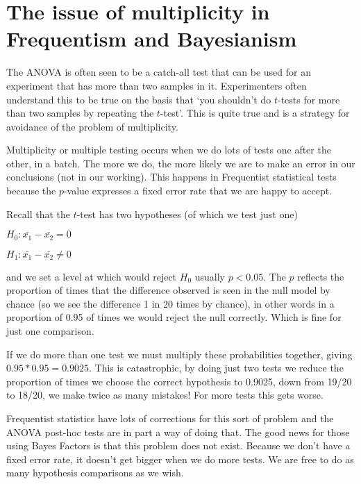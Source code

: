 \documentclass[
]{book}
\begin{document}
\hypertarget{the-issue-of-multiplicity-in-frequentism-and-bayesianism}{%
\section{The issue of multiplicity in Frequentism and Bayesianism}\label{the-issue-of-multiplicity-in-frequentism-and-bayesianism}}

The ANOVA is often seen to be a catch-all test that can be used for an experiment that has more than two samples in it. Experimenters often understand this to be true on the basis that `you shouldn't do \(t\)-tests for more than two samples by repeating the \(t\)-test'. This is quite true and is a strategy for avoidance of the problem of multiplicity.

Multiplicity or multiple testing occurs when we do lots of tests one after the other, in a batch. The more we do, the more likely we are to make an error in our conclusions (not in our working). This happens in Frequentist statistical tests because the \(p\)-value expresses a fixed error rate that we are happy to accept.

Recall that the \(t\)-test has two hypotheses (of which we test just one)

\(H_0 : \bar{x_1} - \bar{x_2} = 0\)

\(H_1 : \bar{x_1} - \bar{x_2} \neq 0\)

and we set a level at which would reject \(H_0\) usually \(p < 0.05\). The \(p\) reflects the proportion of times that the difference observed is seen in the null model by chance (so we see the difference 1 in 20 times by chance), in other words in a proportion of 0.95 of times we would reject the null correctly. Which is fine for just one comparison.

If we do more than one test we must multiply these probabilities together, giving \(0.95 * 0.95 = 0.9025\). This is catastrophic, by doing just two tests we reduce the proportion of times we choose the correct hypothesis to 0.9025, down from 19/20 to 18/20, we make twice as many mistakes! For more tests this gets worse.

Frequentist statistics have lots of corrections for this sort of problem and the ANOVA post-hoc tests are in part a way of doing that. The good news for those using Bayes Factors is that this problem does not exist. Because we don't have a fixed error rate, it doesn't get bigger when we do more tests. We are free to do as many hypothesis comparisons as we wish.
\end{document}
